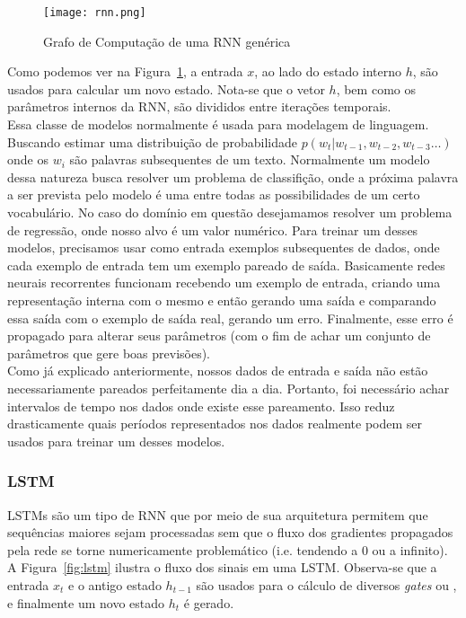 \begin{figure}[H]
\centering
\texttt{[image: rnn.png]}
\caption{Grafo de Computação de uma RNN genérica \citep{dlbook}}
\label{fig:rnngraph}
\end{figure}

Como podemos ver na Figura~\ref{fig:rnngraph}, a entrada $x$, ao lado do estado
interno $h$, são usados para calcular um novo estado. Nota-se que o vetor $h$,
bem como os parâmetros internos da RNN, são divididos entre iterações temporais.
\\

Essa classe de modelos normalmente é usada para modelagem de linguagem. Buscando
estimar uma distribuição de probabilidade $p(w_t | w_{t-1},w_{t-2},w_{t-3} \dots
) $ onde os $w_i$ são palavras subsequentes de um texto. Normalmente um modelo
dessa natureza busca resolver um problema de classifição, onde a próxima palavra
a ser prevista pelo modelo é uma entre todas as possibilidades de um certo
vocabulário. No caso do domínio em questão desejamamos resolver um problema de
regressão, onde nosso alvo é um valor numérico. Para treinar um desses modelos,
precisamos usar como entrada exemplos subsequentes de dados, onde cada exemplo
de entrada tem um exemplo pareado de saída. Basicamente redes neurais
recorrentes funcionam recebendo um exemplo de entrada, criando uma representação
interna com o mesmo e então gerando uma saída e comparando essa saída com o
exemplo de saída real, gerando um erro. Finalmente, esse erro é propagado para
alterar seus parâmetros (com o fim de achar um conjunto de parâmetros que gere
boas previsões). \\ 


Como já explicado anteriormente, nossos dados de entrada e saída não estão necessariamente pareados perfeitamente dia a dia. Portanto, foi necessário achar intervalos de tempo nos dados onde existe esse pareamento. Isso reduz drasticamente quais períodos representados nos dados realmente podem ser usados para treinar um desses modelos.


\subsubsection{LSTM}
\label{sec:lstm}

LSTMs \citep{lstm} são um tipo de RNN que por meio de sua arquitetura permitem que sequências
maiores sejam processadas sem que o fluxo dos gradientes propagados pela rede se torne
numericamente problemático (i.e. tendendo a 0 ou a infinito). A
Figura~\ref{fig:lstm} ilustra o fluxo dos sinais em uma LSTM. Observa-se que a
entrada $x_t$ e o antigo estado $h_{t-1}$ são usados para o cálculo de diversos \textit{gates} ou , e
finalmente um novo estado $h_t$ é gerado.\\

